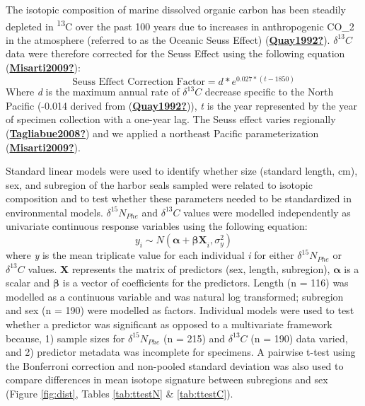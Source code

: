 \documentclass [11pt, proquest] {uwthesis}[2015/03/03]
\begin{document}
The isotopic composition of marine dissolved organic carbon has been steadily depleted in \textsuperscript{13}C over the past 100 years due to increases in anthropogenic CO\_2 in the atmosphere (referred to as the Oceanic Seuss Effect) (\protect\hyperlink{ref-Quay1992}{\textbf{Quay1992?}}). \(\delta^{13}C\) data were therefore corrected for the Seuss Effect using the following equation (\protect\hyperlink{ref-Misarti2009}{\textbf{Misarti2009?}}):
\begin{equation} 
 \mbox {Seuss Effect Correction Factor} =   
  d * e^{0.027*(t-1850)}
  \label{eq:seuss}
\end{equation}
Where \emph{d} is the maximum annual rate of \(\delta^{13}C\) decrease specific to the North Pacific (-0.014 derived from (\protect\hyperlink{ref-Quay1992}{\textbf{Quay1992?}})), \emph{t} is the year represented by the year of specimen collection with a one-year lag. The Seuss effect varies regionally (\protect\hyperlink{ref-Tagliabue2008}{\textbf{Tagliabue2008?}}) and we applied a northeast Pacific parameterization (\protect\hyperlink{ref-Misarti2009}{\textbf{Misarti2009?}}).

Standard linear models were used to identify whether size (standard length, cm), sex, and subregion of the harbor seals sampled were related to isotopic composition and to test whether these parameters needed to be standardized in environmental models. \(\delta^{15}N_{Phe}\) and \(\delta^{13}C\) values were modelled independently as univariate continuous response variables using the following equation:
\begin{equation} 
 y_i \sim N(\boldsymbol{\alpha} + \boldsymbol{\beta X}_i, \sigma^2_y)
  \label{eq:linmods}
\end{equation}
where \emph{y} is the mean triplicate value for each individual \emph{i} for either \(\delta^{15}N_{Phe}\) or \(\delta^{13}C\) values. \textbf{X} represents the matrix of predictors (sex, length, subregion), \(\boldsymbol{\alpha}\) is a scalar and \(\boldsymbol{\beta}\) is a vector of coefficients for the predictors. Length (n = 116) was modelled as a continuous variable and was natural log transformed; subregion and sex (n = 190) were modelled as factors. Individual models were used to test whether a predictor was significant as opposed to a multivariate framework because, 1) sample sizes for \(\delta^{15}N_{Phe}\) (n = 215) and \(\delta^{13}C\) (n = 190) data varied, and 2) predictor metadata was incomplete for specimens. A pairwise t-test using the Bonferroni correction and non-pooled standard deviation was also used to compare differences in mean isotope signature between subregions and sex (Figure \ref{fig:dist}, Tables \ref{tab:ttestN} \& \ref{tab:ttestC}).
\end{document}
